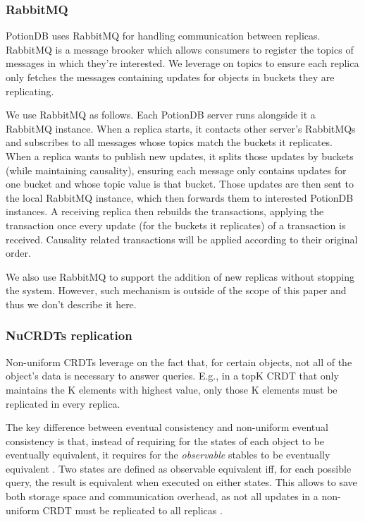\documentclass{vldb}
\begin{document}
\subsubsection{RabbitMQ}
\label{subsubsec:rabbitmq}

PotionDB uses RabbitMQ \cite{???} for handling communication between replicas.
RabbitMQ is a message brooker which allows consumers to register the topics of messages in which they're interested.
We leverage on topics to ensure each replica only fetches the messages containing updates for objects in buckets they are replicating.

We use RabbitMQ as follows.
Each PotionDB server runs alongside it a RabbitMQ instance.
When a replica starts, it contacts other server's RabbitMQs and subscribes to all messages whose topics match the buckets it replicates.
When a replica wants to publish new updates, it splits those updates by buckets (while maintaining causality), ensuring each message only contains updates for one bucket and whose topic value is that bucket.
Those updates are then sent to the local RabbitMQ instance, which then forwards them to interested PotionDB instances.
A receiving replica then rebuilds the transactions, applying the transaction once every update (for the buckets it replicates) of a transaction is received.
Causality related transactions will be applied according to their original order.

We also use RabbitMQ to support the addition of new replicas without stopping the system.
However, such mechanism is outside of the scope of this paper and thus we don't describe it here.

\subsubsection{NuCRDTs replication}
\label{subsubsec:nureplication}

Non-uniform CRDTs \cite{Cabrita17Nonuniform} leverage on the fact that, for certain objects, not all of the object's data is necessary to answer queries.
E.g., in a topK CRDT that only maintains the K elements with highest value, only those K elements must be replicated in every replica.

The key difference between eventual consistency and non-uniform eventual consistency is that, instead of requiring for the states of each object to be eventually equivalent, it requires for the \emph{observable} stables to be eventually equivalent \cite{Cabrita17Nonuniform}.
Two states are defined as observable equivalent iff, for each possible query, the result is equivalent when executed on either states.
This allows to save both storage space and communication overhead, as not all updates in a non-uniform CRDT must be replicated to all replicas \cite{Cabrita17Nonuniform}.
\end{document}
